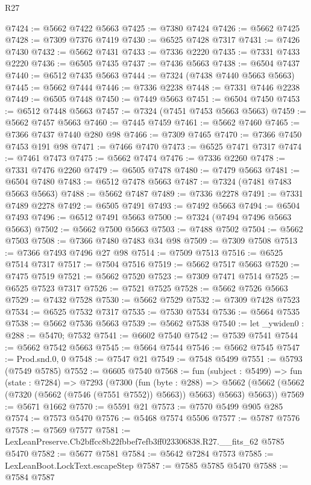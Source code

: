 \begin{lexlean}{R27}
\begin{coremodule}
@7424 := @5662 @7422 @5663
@7425 := @7380 @7424
@7426 := @5662 @7425
@7428 := @7309 @7376 @7419
@7430 := @6525 @7428 @7317
@7431 := @7426 @7430
@7432 := @5662 @7431
@7433 := @7336 @2220
@7435 := @7331 @7433 @2220
@7436 := @6505 @7435
@7437 := @7436 @5663
@7438 := @6504 @7437
@7440 := @6512 @7435 @5663
@7444 := @7324 (@7438 @7440 @5663 @5663)
@7445 := @5662 @7444
@7446 := @7336 @2238
@7448 := @7331 @7446 @2238
@7449 := @6505 @7448
@7450 := @7449 @5663
@7451 := @6504 @7450
@7453 := @6512 @7448 @5663
@7457 := @7324 (@7451 @7453 @5663 @5663)
@7459 := @5662 @7457 @5663
@7460 := @7445 @7459
@7461 := @5662 @7460
@7465 := @7366 @7437 @7440 @280 @98
@7466 := @7309 @7465
@7470 := @7366 @7450 @7453 @191 @98
@7471 := @7466 @7470
@7473 := @6525 @7471 @7317
@7474 := @7461 @7473
@7475 := @5662 @7474
@7476 := @7336 @2260
@7478 := @7331 @7476 @2260
@7479 := @6505 @7478
@7480 := @7479 @5663
@7481 := @6504 @7480
@7483 := @6512 @7478 @5663
@7487 := @7324 (@7481 @7483 @5663 @5663)
@7488 := @5662 @7487
@7489 := @7336 @2278
@7491 := @7331 @7489 @2278
@7492 := @6505 @7491
@7493 := @7492 @5663
@7494 := @6504 @7493
@7496 := @6512 @7491 @5663
@7500 := @7324 (@7494 @7496 @5663 @5663)
@7502 := @5662 @7500 @5663
@7503 := @7488 @7502
@7504 := @5662 @7503
@7508 := @7366 @7480 @7483 @34 @98
@7509 := @7309 @7508
@7513 := @7366 @7493 @7496 @27 @98
@7514 := @7509 @7513
@7516 := @6525 @7514 @7317
@7517 := @7504 @7516
@7519 := @5662 @7517 @5663
@7520 := @7475 @7519
@7521 := @5662 @7520
@7523 := @7309 @7471 @7514
@7525 := @6525 @7523 @7317
@7526 := @7521 @7525
@7528 := @5662 @7526 @5663
@7529 := @7432 @7528
@7530 := @5662 @7529
@7532 := @7309 @7428 @7523
@7534 := @6525 @7532 @7317
@7535 := @7530 @7534
@7536 := @5664 @7535
@7538 := @5662 @7536 @5663
@7539 := @5662 @7538
@7540 := let _ywiden0 : @288 := @5470; @7532
@7541 := @6602 @7540
@7542 := @7539 @7541
@7544 := @5662 @7542 @5663
@7545 := @5664 @7544
@7546 := @5662 @7545
@7547 := Prod.snd.{0, 0}
@7548 := @7547 @21
@7549 := @7548 @5499
@7551 := @5793 (@7549 @5785)
@7552 := @6605 @7540
@7568 := fun (subject : @5499) =>
  fun (state : @7284) =>
  @7293
    (@7300
      (fun (byte : @288) =>
      @5662 (@5662 (@5662 (@7320 (@5662 (@7546 (@7551 @7552)) @5663)) @5663) @5663) @5663))
@7569 := @5671 @1662
@7570 := @5591 @21
@7573 := @7570 @5499 @905 @285
@7574 := @7573 @5470
@7576 := @5468 @7574 @5506
@7577 := @5787 @7576
@7578 := @7569 @7577
@7581 := LexLeanPreserve.Cb2bffcc8b22fbbef7efb3ff023306838.R27.__fits_62 @5785 @5470
@7582 := @5677 @7581
@7584 := @5642 @7284 @7573
@7585 := LexLeanBoot.LockText.escapeStep
@7587 := @7585 @5785 @5470
@7588 := @7584 @7587

\end{coremodule}
\end{lexlean}
